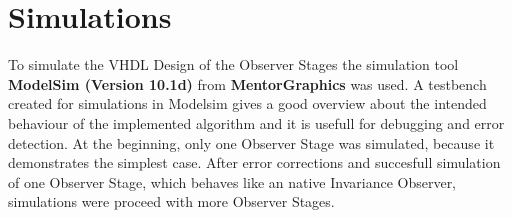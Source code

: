 
%



\section{Simulations}
\label{chapter:4:section:2}
To simulate the VHDL Design of the Observer Stages  the simulation tool \textbf{ModelSim (Version 10.1d)} from \textbf{MentorGraphics} was used.  
A testbench created for simulations in Modelsim gives a good overview about the intended behaviour of the implemented algorithm and it is usefull for debugging and error detection. 
At the beginning, only one Observer Stage was simulated, because it demonstrates the simplest case. 
After error corrections and succesfull simulation of one Observer Stage, which behaves 
like an native Invariance Observer, simulations were proceed with more Observer Stages.\\
 
